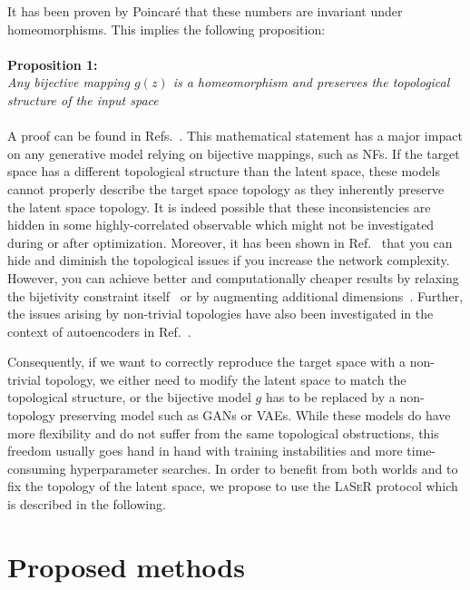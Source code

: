 It has been proven by Poincar\'{e} that these numbers are invariant under homeomorphisms. This implies the following proposition:
\\
\\
\textbf{Proposition 1:}\\
\textit{Any bijective mapping $g(z)$ is a homeomorphism and preserves the topological structure of the input space}
\\\\
A proof can be found in Refs.~\cite{younes2010shapes,dupont2019augmented}.
This mathematical statement has a major impact on any generative model relying on bijective mappings, such as NFs. If the target space has a different topological structure than the latent space, these models cannot properly describe the target space topology as they inherently preserve the latent space topology.  It is indeed possible that these inconsistencies are hidden in some highly-correlated observable which might not be investigated during or after optimization. Moreover, it has been shown in Ref.~\cite{cornish2021relaxing} that you can hide and diminish the topological issues if you increase the network complexity. However, you can achieve better and computationally cheaper results by relaxing the bijetivity constraint itself~\cite{cornish2021relaxing} or by augmenting additional dimensions~\cite{dupont2019augmented, huang2020augmented}. Further, the issues arising by non-trivial topologies have also been investigated in the context of autoencoders in Ref.~\cite{Batson:2021agz}.

Consequently, if we want to correctly reproduce the target space with a non-trivial topology, we either need to modify the latent space to match the topological structure, or the bijective model $g$ has to be replaced by a non-topology preserving model such as GANs or VAEs. While these models do have more flexibility and do not suffer from the same topological obstructions, this freedom usually goes hand in hand with training instabilities and more time-consuming hyperparameter searches. In order to benefit from both worlds and to fix the topology of the latent space, we propose to use the \textsc{LaSeR} protocol which is described in the following.

\section{Proposed methods}
\label{sec:methods}

